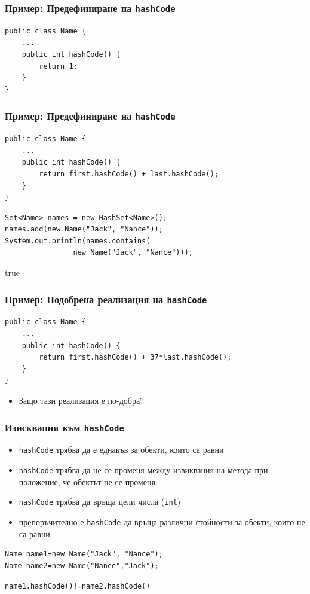 \documentclass[ignorenonframetext, hyperref=unicode,compress]{beamer}
\begin{document}
\begin{frame}[containsverbatim]\frametitle{Пример: Предефиниране на \lstinline{hashCode}}
\begin{lstlisting}
public class Name {
	...
	public int hashCode() {
 		return 1;
	}
}
\end{lstlisting}
\end{frame}

\begin{frame}[containsverbatim]\frametitle{Пример: Предефиниране на \lstinline{hashCode}}
\begin{lstlisting}
public class Name {
	...
	public int hashCode() {
 		return first.hashCode() + last.hashCode();
	}
}
\end{lstlisting}

\begin{lstlisting}
Set<Name> names = new HashSet<Name>();
names.add(new Name("Jack", "Nance"));
System.out.println(names.contains(
				new Name("Jack", "Nance")));
\end{lstlisting}
{\color{blue} true}
\end{frame}

\begin{frame}[containsverbatim]\frametitle{Пример: Подобрена реализация на \lstinline{hashCode}}
\begin{lstlisting}
public class Name {
	...
	public int hashCode() {
 		return first.hashCode() + 37*last.hashCode();
	}
}
\end{lstlisting}
\begin{itemize}
\item Защо тази реализация е по-добра?
\end{itemize}
\end{frame}

\begin{frame}[containsverbatim]\frametitle{Изисквания към \lstinline{hashCode}}
\begin{itemize}
 \item \lstinline{hashCode} трябва да е еднакъв за обекти, които са равни
 \item \lstinline{hashCode} трябва да не се променя между извиквания на метода при положение, че обектът не се променя.
 \item \lstinline{hashCode} трябва да връща цели числа (\lstinline{int})
 \item {\color{red} препоръчително е \lstinline{hashCode} да връща различни стойности за обекти, които не са равни}
\end{itemize}
\begin{lstlisting}
Name name1=new Name("Jack", "Nance");
Name name2=new Name("Nance","Jack");
\end{lstlisting}
\lstinline{name1.hashCode()!=name2.hashCode()}
\end{frame}
\end{document}
